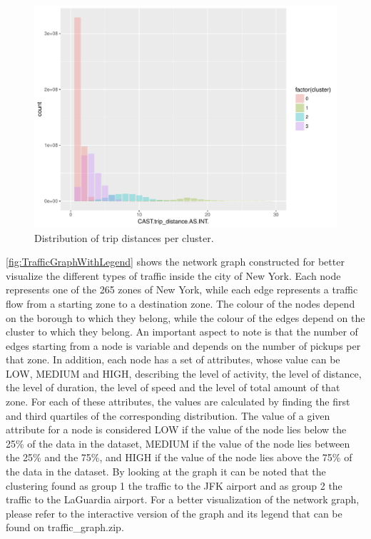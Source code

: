 \documentclass{acm_proc_article-sp-sigmod09}
\begin{document}
\begin{figure}
	\centering
	\includegraphics[width=1\columnwidth]{resources/clustered_plots/trip_distance_distr.pdf}
	\caption{Distribution of trip distances per cluster.}
	\label{fig:TripDistanceDistr}
\end{figure}

\cref{fig:TrafficGraphWithLegend} shows the network graph constructed for better visualize the different types of traffic inside the city of New York. Each node represents one of the 265 zones of New York, while each edge represents a traffic flow from a starting zone to a destination zone. The colour of the nodes depend on the borough to which they belong, while the colour of the edges depend on the cluster to which they belong. An important aspect to note is that the number of edges starting from a node is variable and depends on the number of pickups per that zone. In addition, each node has a set of attributes, whose value can be LOW, MEDIUM and HIGH, describing the level of activity, the level of distance, the level of duration, the level of speed and the level of total amount of that zone. For each of these attributes, the values are calculated by finding the first and third quartiles of the corresponding distribution. The value of a given attribute for a node is considered LOW if the value of the node lies below the 25\% of the data in the dataset, MEDIUM if the value of the node lies between the 25\% and the 75\%, and HIGH if the value of the node lies above the 75\% of the data in the dataset. By looking at the graph it can be noted that the clustering found as group 1 the traffic to the JFK airport and as group 2 the traffic to the LaGuardia airport. For a better visualization of the network graph, please refer to the interactive version of the graph and its legend that can be found on traffic\_graph.zip. 
\end{document}
